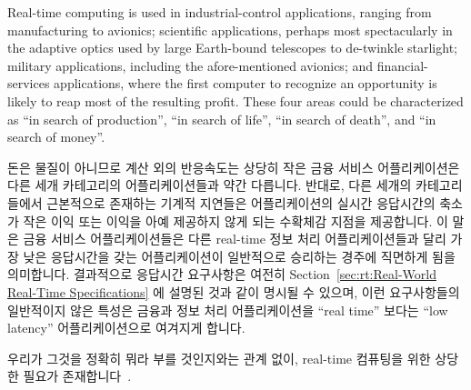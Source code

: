 Real-time computing is used in industrial-control applications, ranging from
manufacturing to avionics;
scientific applications, perhaps most spectacularly in the adaptive
optics used by
large Earth-bound telescopes to de-twinkle starlight;
military applications, including the afore-mentioned avionics;
and financial-services applications, where the first computer to recognize
an opportunity is likely to reap most of the resulting profit.
These four areas could be characterized as ``in search of production'',
``in search of life'', ``in search of death'', and ``in search of money''.
\fi

돈은 물질이 아니므로 계산 외의 반응속도는 상당히 작은 금융 서비스
어플리케이션은 다른 세개 카테고리의 어플리케이션들과 약간 다릅니다.
반대로, 다른 세개의 카테고리들에서 근본적으로 존재하는 기계적 지연들은
어플리케이션의 실시간 응답시간의 축소가 작은 이익 또는 이익을 아예 제공하지
않게 되는 수확체감 지점을 제공합니다.
이 말은 금융 서비스 어플리케이션들은 다른 real-time 정보 처리 어플리케이션들과
달리 가장 낮은 응답시간을 갖는 어플리케이션이 일반적으로 승리하는 경주에
직면하게 됨을 의미합니다.
결과적으로 응답시간 요구사항은 여전히
Section~\ref{sec:rt:Real-World Real-Time Specifications} 에 설명된 것과 같이
명시될 수 있으며, 이런 요구사항들의 일반적이지 않은 특성은 금융과 정보 처리
어플리케이션을 ``real time'' 보다는 ``low latency'' 어플리케이션으로 여겨지게
합니다.

우리가 그것을 정확히 뭐라 부를 것인지와는 관계 없이, real-time 컴퓨팅을 위한
상당한 필요가 존재합니다~\cite{JeremyWPeters2006NYTDec11,BillInmon2007a}.


